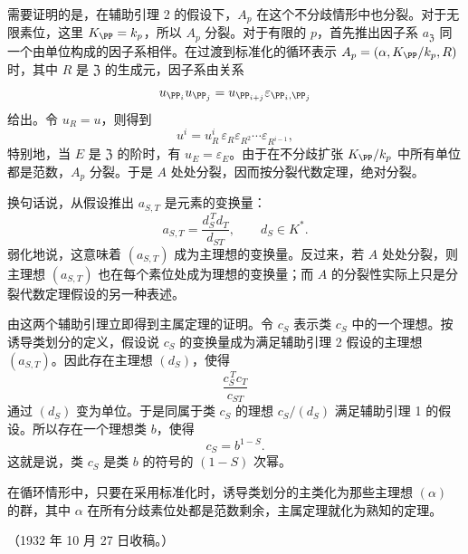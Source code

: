 需要证明的是，在辅助引理 2 的假设下，\(A_p\) 在这个不分歧情形中也分裂。对于无限素位，这里 \(K_\PP=k_p\)，所以 \(A_p\) 分裂。对于有限的 \(p\)，首先推出因子系 \(a_{\mathfrak Z}\) 同一个由单位构成的因子系相伴。在过渡到标准化的循环表示 \(A_p=(\alpha,K_\PP/k_p,R)\) 时，其中 \(R\) 是 \(\mathfrak Z\) 的生成元，因子系由关系
\[
        u_{\PP_i}u_{\PP_j}=u_{\PP_{i+j}}\varepsilon_{\PP_i,\PP_j}
\]
给出。令 \(u_R=u\)，则得到
\[
        u^i=u_R^i\,\varepsilon_R\varepsilon_{R^2}\cdots \varepsilon_{R^{i-1}},
\]
特别地，当 \(E\) 是 \(\mathfrak Z\) 的阶时，有 \(u_E=\varepsilon_E\)。由于在不分歧扩张 \(K_\PP/k_p\) 中所有单位都是范数，\(A_p\) 分裂。于是 \(A\) 处处分裂，因而按分裂代数定理，绝对分裂。

换句话说，从假设推出 \(a_{S,T}\) 是元素的变换量：
\[
        a_{S,T}=\frac{d_S^{\,T}d_T}{d_{ST}},
        \qquad d_S\in K^*.
\]
弱化地说，这意味着 \((a_{S,T})\) 成为主理想的变换量。反过来，若 \(A\) 处处分裂，则主理想 \((a_{S,T})\) 也在每个素位处成为理想的变换量；而 \(A\) 的分裂性实际上只是分裂代数定理假设的另一种表述。

由这两个辅助引理立即得到主属定理的证明。令 \(c_S\) 表示类 \(c_S\) 中的一个理想。按诱导类划分的定义，假设说 \(c_S\) 的变换量成为满足辅助引理 2 假设的主理想 \((a_{S,T})\)。因此存在主理想 \((d_S)\)，使得
\[
        \frac{c_S^{\,T}c_T}{c_{ST}}
\]
通过 \((d_S)\) 变为单位。于是同属于类 \(c_S\) 的理想 \(c_S/(d_S)\) 满足辅助引理 1 的假设。所以存在一个理想类 \(b\)，使得
\[
        c_S=b^{1-S}.
\]
这就是说，类 \(c_S\) 是类 \(b\) 的符号的 \((1-S)\) 次幂。

在循环情形中，只要在采用标准化时，诱导类划分的主类化为那些主理想 \((\alpha)\) 的群，其中 \(\alpha\) 在所有分歧素位处都是范数剩余，主属定理就化为熟知的定理。

\begin{center}
（1932 年 10 月 27 日收稿。）
\end{center}

\clearpage
\setcounter{footnote}{0}

